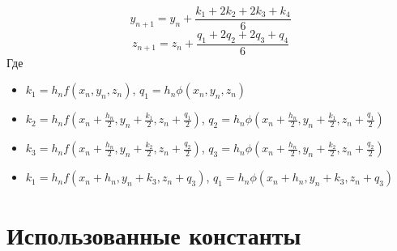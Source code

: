 \documentclass[a4paper,12pt]{article}
\begin{document}
\[y_{n+1} = y_n + \frac{k_1 + 2k_2 + 2k_3 + k_4}{6}\]
\[z_{n+1} = z_n + \frac{q_1 + 2q_2 + 2q_3 + q_4}{6}\]
Где 
\begin{itemize}
	\item $k_1 = h_n f(x_n, y_n, z_n)$, $q_1 = h_n \phi(x_n, y_n, z_n)$
	\item $k_2 = h_n f(x_n + \frac{h_n}{2}, y_n + \frac{k_1}{2}, z_n + \frac{q_1}{2})$, $q_2 = h_n \phi(x_n + \frac{h_n}{2}, y_n + \frac{k_1}{2}, z_n + \frac{q_1}{2})$
	\item $k_3 = h_n f(x_n + \frac{h_n}{2}, y_n + \frac{k_2}{2}, z_n + \frac{q_2}{2})$, $q_3 = h_n \phi(x_n + \frac{h_n}{2}, y_n + \frac{k_2}{2}, z_n + \frac{q_2}{2})$
	\item $k_1 = h_n f(x_n + h_n, y_n + k_3, z_n + q_3)$, $q_1 = h_n \phi(x_n + h_n, y_n + k_3, z_n + q_3)$
\end{itemize}


\newpage
\section{Использованные константы}
\end{document}
